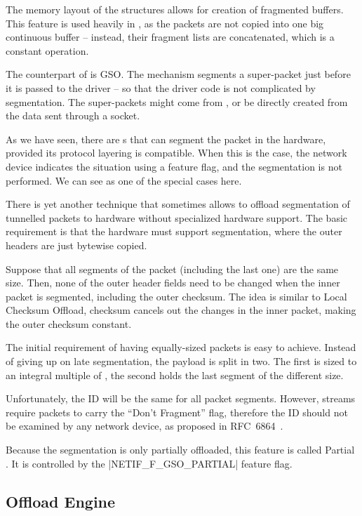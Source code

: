 The memory layout of the \skb{} structures allows for creation of fragmented
buffers. This feature is used heavily in , as the packets are not copied
into one big continuous buffer -- instead, their fragment lists are
concatenated, which is a constant operation.

The counterpart of  is \acrfull{GSO}. The  mechanism segments
a super-packet just before it is passed to the driver -- so that the driver
code is not complicated by segmentation. The super-packets might come from
, or be directly created from the data sent through a socket.

As we have seen, there are s that can segment the packet in the
hardware, provided its protocol layering is compatible. When this is the
case, the network device indicates the situation using a feature flag, and the
segmentation is not performed. We can see  as one of the special cases
here.

There is yet another technique that sometimes allows to offload segmentation
of tunnelled packets to hardware without specialized hardware support. The basic
requirement is that the hardware must support segmentation, where the outer
headers are just bytewise copied.

Suppose that all segments of the packet (including the last one) are the same size. Then,
none of the outer header fields need to be changed when the inner packet is
segmented, including the outer checksum. The idea is similar to Local Checksum
Offload, checksum cancels out the changes in the inner packet, making the outer
checksum constant.

The initial requirement of having equally-sized packets is easy to achieve.
Instead of giving up on late segmentation, the payload is split in two. The
first is sized to an integral multiple of , the second holds the last
segment of the different size.

Unfortunately, the  ID will be the same for all packet segments.
However,  streams require  packets to carry the ``Don't
Fragment'' flag, therefore the ID should not be examined by any network device,
as proposed in RFC~6864~\cite{RFC6864}.

Because the segmentation is only partially offloaded, this feature is called
Partial . It is controlled by the \macro|NETIF_F_GSO_PARTIAL| feature flag.

\subsection{ Offload Engine}

